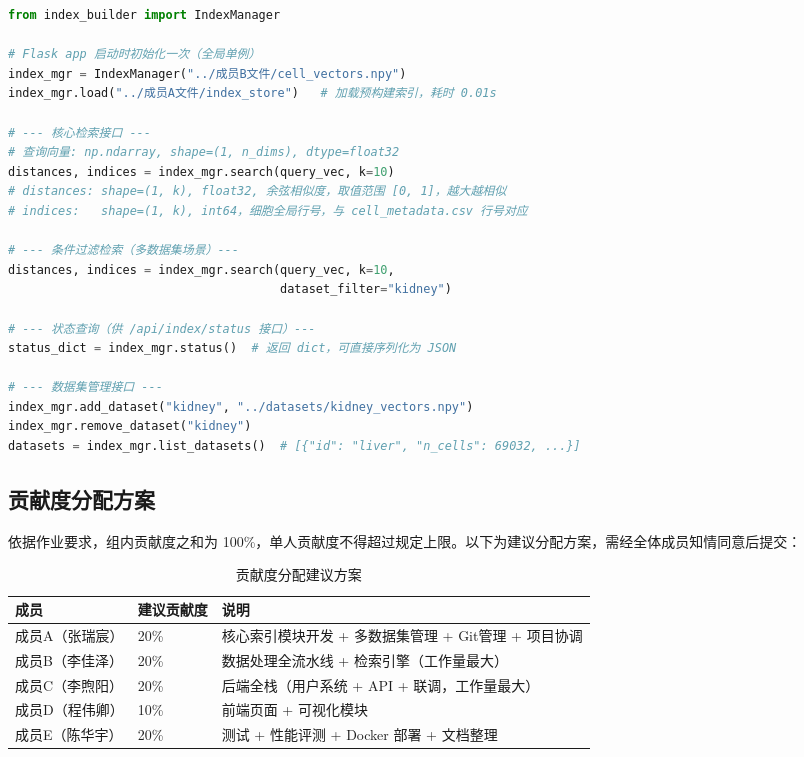 \documentclass[a4paper]{article}
\begin{document}
\begin{lstlisting}[language=Python, caption=成员C调用IndexManager的接口示例]
from index_builder import IndexManager

# Flask app 启动时初始化一次（全局单例）
index_mgr = IndexManager("../成员B文件/cell_vectors.npy")
index_mgr.load("../成员A文件/index_store")   # 加载预构建索引，耗时 0.01s

# --- 核心检索接口 ---
# 查询向量: np.ndarray, shape=(1, n_dims), dtype=float32
distances, indices = index_mgr.search(query_vec, k=10)
# distances: shape=(1, k), float32, 余弦相似度，取值范围 [0, 1]，越大越相似
# indices:   shape=(1, k), int64，细胞全局行号，与 cell_metadata.csv 行号对应

# --- 条件过滤检索（多数据集场景）---
distances, indices = index_mgr.search(query_vec, k=10,
                                      dataset_filter="kidney")

# --- 状态查询（供 /api/index/status 接口）---
status_dict = index_mgr.status()  # 返回 dict，可直接序列化为 JSON

# --- 数据集管理接口 ---
index_mgr.add_dataset("kidney", "../datasets/kidney_vectors.npy")
index_mgr.remove_dataset("kidney")
datasets = index_mgr.list_datasets()  # [{"id": "liver", "n_cells": 69032, ...}]
\end{lstlisting}

\subsection{贡献度分配方案}
依据作业要求，组内贡献度之和为 100\%，单人贡献度不得超过规定上限。以下为建议分配方案，需经全体成员知情同意后提交：

\begin{table}[H]
\centering
\small
\caption{贡献度分配建议方案}
\begin{tabularx}{\linewidth}{p{3.5cm}p{2cm}X}
\toprule
成员 & 建议贡献度 & 说明 \\
\midrule
成员A（张瑞宸） & 20\% & 核心索引模块开发 + 多数据集管理 + Git管理 + 项目协调 \\
成员B（李佳泽） & 20\% & 数据处理全流水线 + 检索引擎（工作量最大） \\
成员C（李煦阳） & 20\% & 后端全栈（用户系统 + API + 联调，工作量最大） \\
成员D（程伟卿） & 10\% & 前端页面 + 可视化模块 \\
成员E（陈华宇） & 20\% & 测试 + 性能评测 + Docker 部署 + 文档整理 \\
\bottomrule
\end{tabularx}
\end{table}
\end{document}
